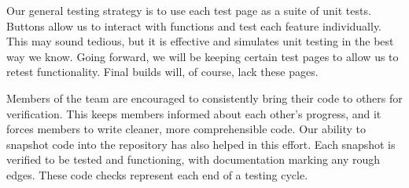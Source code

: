 \documentclass[12pt]{article}
\begin{document}
Our general testing strategy is to use each test page as a suite of unit tests.  Buttons allow us to interact with functions and test each feature individually.  This may sound tedious, but it is effective and simulates unit testing in the best way we know.  Going forward, we will be keeping certain test pages to allow us to retest functionality.  Final builds will, of course, lack these pages.

Members of the team are encouraged to consistently bring their code to others for verification.  This keeps members informed about each other's progress, and it forces members to write cleaner, more comprehensible code.  Our ability to snapshot code into the repository has also helped in this effort.  Each snapshot is verified to be tested and functioning, with documentation marking any rough edges.  These code checks represent each end of a testing cycle.
\end{document}

